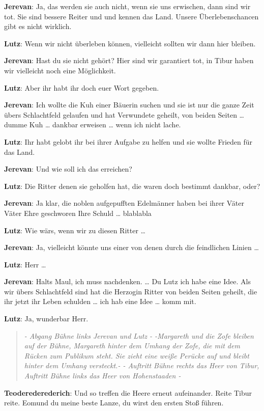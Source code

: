 \documentclass[a5paper,6pt]{book}
\begin{document}
\textbf{Jerevan}: Ja, das werden sie auch nicht, wenn sie uns erwischen, dann sind wir tot. Sie sind bessere Reiter und und kennen das Land. Unsere Überlebenschancen gibt es nicht wirklich.

\textbf{Lutz}: Wenn wir nicht überleben können, vielleicht sollten wir dann hier bleiben.

\textbf{Jerevan}: Hast du sie nicht gehört? Hier sind wir garantiert tot, in Tibur haben wir vielleicht noch eine Möglichkeit.

\textbf{Lutz}: Aber ihr habt ihr doch euer Wort gegeben.

\textbf{Jerevan}: Ich wollte die Kuh einer Bäuerin suchen und sie ist nur die ganze Zeit übers Schlachtfeld gelaufen und hat Verwundete geheilt, von beiden Seiten … dumme Kuh … dankbar erweisen … wenn ich nicht lache.

\textbf{Lutz}: Ihr habt gelobt ihr bei ihrer Aufgabe zu helfen und sie wollte Frieden für das Land.

\textbf{Jerevan}: Und wie soll ich das erreichen?

\textbf{Lutz}: Die Ritter denen sie geholfen hat, die waren doch bestimmt dankbar, oder?

\textbf{Jerevan}: Ja klar, die noblen aufgepufften Edelmänner haben bei ihrer Väter Väter Ehre geschworen Ihre Schuld … blablabla

\textbf{Lutz}: Wie wärs, wenn wir zu diesen Ritter …

\textbf{Jerevan}: Ja, vielleicht könnte uns einer von denen durch die feindlichen Linien …

\textbf{Lutz}: Herr …

\textbf{Jerevan}: Halts Maul, ich muss nachdenken. … Du Lutz ich habe eine Idee. Als wir übers Schlachtfeld sind hat die Herzogin Ritter von beiden Seiten geheilt, die ihr jetzt ihr Leben schulden … ich hab eine Idee … komm mit.

\textbf{Lutz}: Ja, wunderbar Herr.

\begin{quote}
  \textit{- Abgang Bühne links Jerevan und Lutz -
-Margareth und die Zofe bleiben auf der Bühne, Margareth hinter dem Umhang der Zofe, die mit dem Rücken zum Publikum steht. Sie zieht eine weiße Perücke auf und bleibt hinter dem Umhang versteckt.-
- Auftritt Bühne rechts das Heer von Tibur, Auftritt Bühne links das Heer von Hohenstaaden -
}
 \end{quote}

\textbf{Teoderederederich}: Und so treffen die Heere erneut aufeinander. Reite Tibur reite. Eomund du meine beste Lanze, du wirst den ersten Stoß führen.
\end{document}
